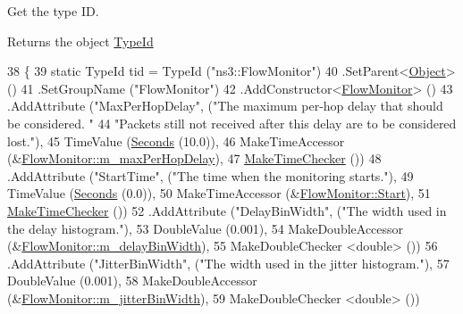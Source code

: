 Get the type ID. 

\begin{DoxyReturn}{Returns}
the object \hyperlink{classns3_1_1TypeId}{Type\+Id} 
\end{DoxyReturn}

\begin{DoxyCode}
38 \{
39   \textcolor{keyword}{static} TypeId tid = TypeId (\textcolor{stringliteral}{"ns3::FlowMonitor"})
40     .SetParent<\hyperlink{classns3_1_1Object_a40860402e64d8008fb42329df7097cdb}{Object}> ()
41     .SetGroupName (\textcolor{stringliteral}{"FlowMonitor"})
42     .AddConstructor<\hyperlink{classns3_1_1FlowMonitor_a1d8f90827a1d9686cde7195e8fb32bf8}{FlowMonitor}> ()
43     .AddAttribute (\textcolor{stringliteral}{"MaxPerHopDelay"}, (\textcolor{stringliteral}{"The maximum per-hop delay that should be considered.  "}
44                                       \textcolor{stringliteral}{"Packets still not received after this delay are to be considered
       lost."}),
45                    TimeValue (\hyperlink{group__timecivil_ga33c34b816f8ff6628e33d5c8e9713b9e}{Seconds} (10.0)),
46                    MakeTimeAccessor (&\hyperlink{classns3_1_1FlowMonitor_a9f05e6d42213432dc8a6f79510b38b6c}{FlowMonitor::m\_maxPerHopDelay}),
47                    \hyperlink{group__time_ga7032965bd4afa578691d88c09e4481c1}{MakeTimeChecker} ())
48     .AddAttribute (\textcolor{stringliteral}{"StartTime"}, (\textcolor{stringliteral}{"The time when the monitoring starts."}),
49                    TimeValue (\hyperlink{group__timecivil_ga33c34b816f8ff6628e33d5c8e9713b9e}{Seconds} (0.0)),
50                    MakeTimeAccessor (&\hyperlink{classns3_1_1FlowMonitor_a32cb7ddc6d0956518a59f7ed91de7f6d}{FlowMonitor::Start}),
51                    \hyperlink{group__time_ga7032965bd4afa578691d88c09e4481c1}{MakeTimeChecker} ())
52     .AddAttribute (\textcolor{stringliteral}{"DelayBinWidth"}, (\textcolor{stringliteral}{"The width used in the delay histogram."}),
53                    DoubleValue (0.001),
54                    MakeDoubleAccessor (&\hyperlink{classns3_1_1FlowMonitor_ac8f534e4fc447540021387c854ec8fc1}{FlowMonitor::m\_delayBinWidth}),
55                    MakeDoubleChecker <double> ())
56     .AddAttribute (\textcolor{stringliteral}{"JitterBinWidth"}, (\textcolor{stringliteral}{"The width used in the jitter histogram."}),
57                    DoubleValue (0.001),
58                    MakeDoubleAccessor (&\hyperlink{classns3_1_1FlowMonitor_a77909688b3900c5a60059f414900d23d}{FlowMonitor::m\_jitterBinWidth}),
59                    MakeDoubleChecker <double> ())

\end{DoxyCode}

